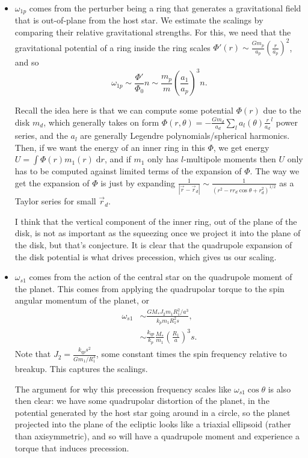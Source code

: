 \documentclass[11pt,
        usenames, %
        dvipsnames %
    ]{article}
\newcommand*{\abs}[1]{\left|#1\right|}
\newcommand*{\p}[1]{\left(#1\right)}
\begin{document}
\begin{itemize}
    \item $\omega_{1p}$ comes from the perturber being a ring that generates a
        gravitational field that is out-of-plane from the host star. We estimate
        the scalings by comparing their relative gravitational strengths. For
        this, we need that the gravitational potential of a ring inside the ring
        scales $\Phi'(r) \sim \frac{Gm_p}{a_p}\p{\frac{r}{a_p}}^2$, and so
        \begin{equation}
            \omega_{1p} \sim \frac{\Phi'}{\Phi_0}n
                \sim \frac{m_p}{m}\p{\frac{a_1}{a_p}}^3n.
        \end{equation}

        Recall the idea here is that we can compute some potential $\Phi(r)$ due
        to the disk $m_d$, which generally takes on form $\Phi(r, \theta) =
        -\frac{Gm_d}{a_d}\sum\limits_l a_l(\theta) \frac{r}{a_d}^l$ power
        series, and the $a_l$ are generally Legendre polynomials/spherical
        harmonics. Then, if we want the energy of an inner ring in this $\Phi$,
        we get energy $U = \int \Phi(r) m_1(r) \;\mathrm{d}r$, and if $m_1$ only
        has $l$-multipole moments then $U$ only has to be computed against
        limited terms of the expansion of $\Phi$. The way we get the expansion
        of $\Phi$ is just by expanding $\frac{1}{\abs{\vec{r} - \vec{r}_d}}
        \sim \frac{1}{\p{r^2 - rr_d\cos\theta + r_d^2}^{1/2}}$ as a Taylor
        series for small $\vec{r}_d$.

        I think that the vertical component of the inner ring, out of the plane
        of the disk, is not as important as the squeezing once we project it
        into the plane of the disk, but that's conjecture. It is clear that the
        quadrupole expansion of the disk potential is what drives precession,
        which gives us our scaling.

    \item $\omega_{s1}$ comes from the action of the central star on the
        quadrupole moment of the planet. This comes from applying the
        quadrupolar torque to the spin angular momentum of the planet, or
        \begin{align}
            \omega_{s1} &\sim \frac{GM_* J_2 m_1 R_1^2/a^3}{k_p m_1 R_1^2s},\\
                &\sim \frac{k_{qp}}{k_p}\frac{M_*}{m_1} \p{\frac{R_1}{a}}^3s.
        \end{align}
        Note that $J_2 = \frac{k_{qp}s^2}{Gm_1/R_1^3}$, some constant times the
        spin frequency relative to breakup. This captures the scalings.

        The argument for why this precession frequency scales like
        $\omega_{s1}\cos \theta$ is also then clear: we have some quadrupolar
        distortion of the planet, in the potential generated by the host star
        going around in a circle, so the planet projected into the plane of the
        ecliptic looks like a triaxial ellipsoid (rather than axisymmetric), and
        so will have a quadrupole moment and experience a torque that induces
        precession.
\end{itemize}
\end{document}
